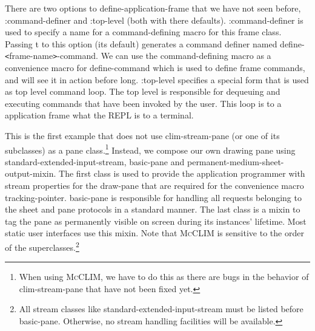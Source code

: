 \documentclass[twocolumn,a4paper]{article}
\newcommand {\code}[1]{{\sffamily #1}}
\newcommand {\mcclim}{\textsc{McCLIM}}
\let\class\code
\let\method\code
\let\constant\code
\let\macro\code
\let\keyword\code
\begin{document}
There are two options to \macro{define-application-frame} that we have
not seen before, \keyword{:command-definer} and \keyword{:top-level}
(both with there defaults). \keyword{:command-definer} is used to
specify a name for a command-defining macro for this frame
class. Passing \constant{t} to this option (its default) generates a
command definer named
\macro{define-\texttt{<}frame-name\texttt{>}-command}. We can use the
command-defining macro as a convenience macro for
\method{define-command} which is used to define frame commands, and 
will see it in action before long. \keyword{:top-level} specifies a
special form that is used as top level command loop. The top level is
responsible for dequeuing and executing commands that have been
invoked by the user. This loop is to a application frame what the REPL
is to a terminal.

This is the first example that does not use \class{clim-stream-pane}
(or one of its subclasses) as a pane class.\footnote{When using \mcclim{},
we have to do this as there are bugs in the behavior of
\class{clim-stream-pane} that have not been fixed yet.} Instead, we
compose our own drawing pane using
\class{standard-extended-input-stream}, \class{basic-pane} and
\class{permanent-medium-sheet-output-mixin}. The first class is used
to provide the application programmer with stream properties for the
draw-pane that are required for the convenience macro
\macro{tracking-pointer}. \class{basic-pane} is responsible for
handling all requests belonging to the sheet and pane protocols in a
standard manner. The last class is a mixin to tag the pane as
permanently visible on screen during its instances' lifetime. Most
static user interfaces use this mixin. Note that \mcclim{} is sensitive
to the order of the superclasses.\footnote{All stream classes like
\class{standard-extended-input-stream} must be listed before
\class{basic-pane}. Otherwise, no stream handling facilities
will be available.}

\end{document}

